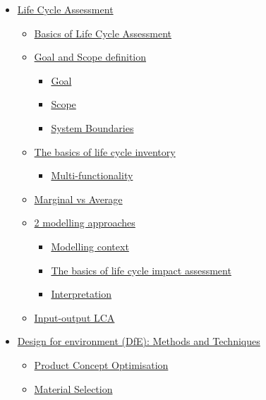 \begin{itemize}
\tightlist
\item
  \protect\hyperlink{life-cycle-assessment}{Life Cycle Assessment}

  \begin{itemize}
  \tightlist
  \item
    \protect\hyperlink{basics-of-life-cycle-assessment}{Basics of Life
    Cycle Assessment}
  \item
    \protect\hyperlink{goal-and-scope-definition}{Goal and Scope
    definition}

    \begin{itemize}
    \tightlist
    \item
      \protect\hyperlink{goal}{Goal}
    \item
      \protect\hyperlink{scope}{Scope}
    \item
      \protect\hyperlink{system-boundaries}{System Boundaries}
    \end{itemize}
  \item
    \protect\hyperlink{the-basics-of-life-cycle-inventory}{The basics of
    life cycle inventory}

    \begin{itemize}
    \tightlist
    \item
      \protect\hyperlink{multi-functionality}{Multi-functionality}
    \end{itemize}
  \item
    \protect\hyperlink{marginal-vs-average}{Marginal vs Average}
  \item
    \protect\hyperlink{2-modelling-approaches}{2 modelling approaches}

    \begin{itemize}
    \tightlist
    \item
      \protect\hyperlink{modelling-context}{Modelling context}
    \item
      \protect\hyperlink{the-basics-of-life-cycle-impact-assessment}{The
      basics of life cycle impact assessment}
    \item
      \protect\hyperlink{interpretation}{Interpretation}
    \end{itemize}
  \item
    \protect\hyperlink{input-output-lca}{Input-output LCA}
  \end{itemize}
\item
  \protect\hyperlink{design-for-environment-dfe-methods-and-techniques}{Design
  for environment (DfE): Methods and Techniques}

  \begin{itemize}
  \tightlist
  \item
    \protect\hyperlink{product-concept-optimisation}{Product Concept
    Optimisation}
  \item
    \protect\hyperlink{material-selection}{Material Selection}
  \end{itemize}
\end{itemize}

